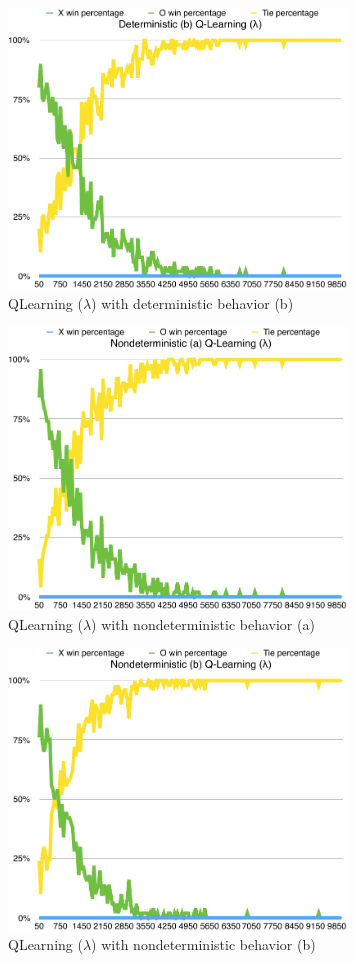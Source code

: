 \documentclass{journal}
\begin{document}
\begin{figure}[h]
	\includegraphics[width=0.8\textwidth]{QLearningLD(b).pdf}
	\caption{QLearning ($\lambda{}$) with deterministic behavior (b)}\label{fig:QLDB}
\end{figure}
\begin{figure}[h]
	\includegraphics[width=0.8\textwidth]{QLearningLN(a).pdf}
	\caption{QLearning ($\lambda{}$) with nondeterministic behavior (a)}\label{fig:QLNA}
\end{figure}
\begin{figure}[h]
	\includegraphics[width=0.8\textwidth]{QLearningLN(b).pdf}
	\caption{QLearning ($\lambda{}$) with nondeterministic behavior (b)}\label{fig:QLNB}
\end{figure}
\end{document}
